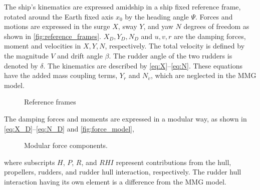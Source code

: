 The ship's kinematics are expressed amidship in a ship fixed reference frame, rotated around the Earth fixed axis $x_0$ by the heading angle \(\Psi\). Forces and motions are expressed in the surge $X$, sway $Y$, and yaw $N$ degrees of freedom as shown in \autoref{fig:reference_frames}. 
$X_D,Y_D,N_D$ and $u,v,r$ are the damping forces, moment and velocities in $X,Y,N$, respectively.
The total velocity is defined by the magnitude \(V\) and drift angle \(\beta\). The rudder angle of the two rudders is denoted by \(\delta\).
The kinematics are described by \autoref{eq:X}--\autoref{eq:N}. These equations have the added mass coupling terms, $Y_{\dot{r}}$ and $N_{\dot{v}}$, which are neglected in the MMG model.
%
\begin{figure}[h]
    \centering
    
    \caption{Reference frames}
    \label{fig:reference_frames}
\end{figure}
%
\begin{equation}
    \label{eq:X}
    
\end{equation}
%
\begin{equation}
    \label{eq:Y}
    
\end{equation}
%
\begin{equation}
    \label{eq:N}
    
\end{equation}
The damping forces and moments are expressed in a modular way, as shown in \autoref{eq:X_D}--\autoref{eq:N_D} and \autoref{fig:force_model},
\begin{equation}
    \label{eq:X_D}
    
\end{equation}
%
\begin{equation}
    \label{eq:Y_D}
    
\end{equation}
%
\begin{equation}
    \label{eq:N_D}
    
\end{equation}
%
\begin{figure}[h]
    \centering
    
    \caption{Modular force components.}
    \label{fig:force_model}
\end{figure}
where subscripts $H$, $P$, $R$, and $RHI$ represent contributions from the hull, propellers, rudders, and rudder hull interaction, respectively. The rudder hull interaction having its own element is a difference from the MMG model.

